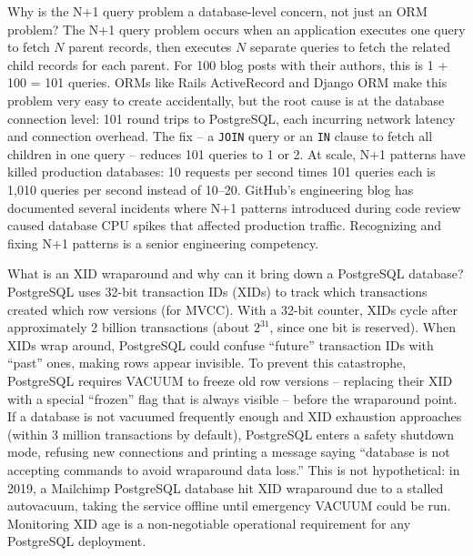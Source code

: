 \documentclass[11pt,a4paper]{article}
\begin{document}
\begin{curiobox}{Why is the N+1 query problem a database-level concern, not just an ORM problem?}
The N+1 query problem occurs when an application executes one query to fetch $N$ parent records, then executes $N$ separate queries to fetch the related child records for each parent. For 100 blog posts with their authors, this is 1 + 100 = 101 queries. ORMs like Rails ActiveRecord and Django ORM make this problem very easy to create accidentally, but the root cause is at the database connection level: 101 round trips to PostgreSQL, each incurring network latency and connection overhead. The fix -- a \texttt{JOIN} query or an \texttt{IN} clause to fetch all children in one query -- reduces 101 queries to 1 or 2. At scale, N+1 patterns have killed production databases: 10 requests per second times 101 queries each is 1,010 queries per second instead of 10--20. GitHub's engineering blog has documented several incidents where N+1 patterns introduced during code review caused database CPU spikes that affected production traffic. Recognizing and fixing N+1 patterns is a senior engineering competency.
\end{curiobox}

\begin{curiobox}{What is an XID wraparound and why can it bring down a PostgreSQL database?}
PostgreSQL uses 32-bit transaction IDs (XIDs) to track which transactions created which row versions (for MVCC). With a 32-bit counter, XIDs cycle after approximately 2 billion transactions (about $2^{31}$, since one bit is reserved). When XIDs wrap around, PostgreSQL could confuse ``future'' transaction IDs with ``past'' ones, making rows appear invisible. To prevent this catastrophe, PostgreSQL requires VACUUM to freeze old row versions -- replacing their XID with a special ``frozen'' flag that is always visible -- before the wraparound point. If a database is not vacuumed frequently enough and XID exhaustion approaches (within 3 million transactions by default), PostgreSQL enters a safety shutdown mode, refusing new connections and printing a message saying ``database is not accepting commands to avoid wraparound data loss.'' This is not hypothetical: in 2019, a Mailchimp PostgreSQL database hit XID wraparound due to a stalled autovacuum, taking the service offline until emergency VACUUM could be run. Monitoring XID age is a non-negotiable operational requirement for any PostgreSQL deployment.
\end{curiobox}

\newpage
\end{document}
